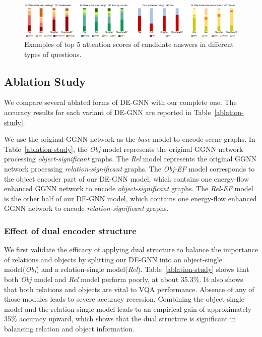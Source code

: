 \documentclass[letterpaper]{article} %
\begin{document}
\begin{figure}[ht] 
    \centering 
    \includegraphics[width=1\textwidth]{./pic/visual_detail.pdf} 
    \caption{Examples of top 5 attention scores of candidate answers in different types of questions.} 
    \label{visualbis} 
\end{figure}


\subsection{Ablation Study}
We compare several ablated forms of DE-GNN with our complete one. 
The accuracy results for each variant of DE-GNN are reported in Table~\ref{ablation-study}. 

We use the original GGNN network as the \emph{base} model to encode scene graphs.
In Table~\ref{ablation-study}, the \emph{Obj} model represents the original GGNN network processing \emph{object-significant} graphs. The \emph{Rel} model represents the original GGNN network processing \emph{relation-significant} graphs.
The \emph{Obj-EF} model corresponds to the object encoder part of our DE-GNN model, which contains one energy-flow enhanced GGNN network to encode \emph{object-significant} graphs. 
The \emph{Rel-EF} model is the other half of our DE-GNN model, which contains one energy-flow enhanced GGNN network to encode \emph{relation-significant} graphs.

\subsubsection{Effect of dual encoder structure} We first validate the efficacy of applying dual structure to balance the importance of relations and objects by splitting our DE-GNN into an object-single model(\emph{Obj}) and a relation-single model(\emph{Rel}). Table~\ref{ablation-study} shows that both \emph{Obj} model and \emph{Rel} model perform poorly, at about 35.3\%. It also shows that both relations and objects are vital to VQA performance. 
Absence of any of those modules leads to severe accuracy recession. 
Combining the object-single model and the relation-single model leads to an empirical gain of approximately 35\% accuracy upward, which shows that the dual structure is significant in balancing relation and object information. 
\end{document}
